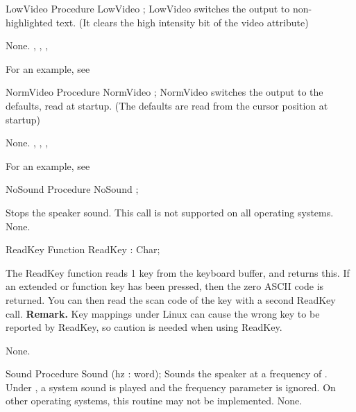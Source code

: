  
\begin{procedure}{LowVideo}
\Declaration
Procedure LowVideo ;
\Description
 LowVideo switches the output to non-highlighted text. (It clears the high
intensity bit of the video attribute)

\Errors
None.
\SeeAlso
 , , ,
\end{procedure}
For an example, see 
\begin{procedure}{NormVideo}
\Declaration
Procedure NormVideo ;
\Description
 NormVideo switches the output to the defaults, read at startup. (The
defaults are read from the cursor position at startup)

\Errors
None.
\SeeAlso
 , , ,
\end{procedure}
For an example, see 
\begin{procedure}{NoSound}
\Declaration
Procedure NoSound ;
\Description

Stops the speaker sound.
This call is not supported on all operating systems.
\Errors
None.
\SeeAlso
{}
\end{procedure}

 
\begin{function}{ReadKey}
\Declaration
Function ReadKey  : Char;
\Description

The ReadKey function reads 1 key from the keyboard buffer, and returns this.
If an extended or function key has been pressed, then the zero ASCII code is 
returned. You can then read the scan code of the key with a second ReadKey
call.
\textbf{Remark.} Key mappings under Linux can cause the wrong key to be
reported by ReadKey, so caution is needed when using ReadKey.  

\Errors
None.
\SeeAlso
{}
\end{function}




\begin{procedure}{Sound}
\Declaration
Procedure Sound (hz : word);
\Description
 Sounds the speaker at a frequency of . Under \windows,
 a system sound is played and the frequency parameter is ignored.
 On other operating systems, this routine may not be implemented.
\Errors
None.
\SeeAlso
{}
\end{procedure}

